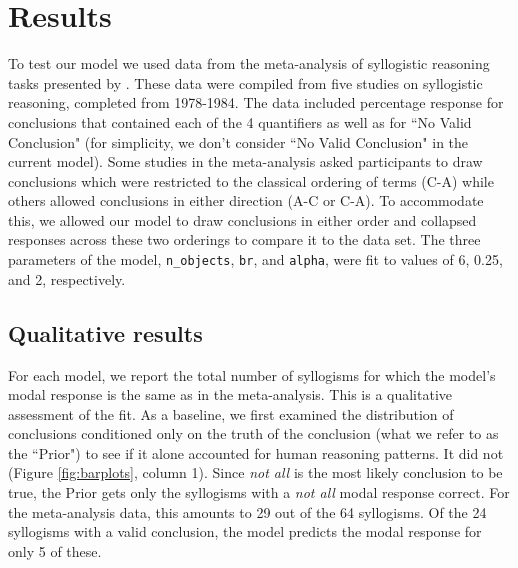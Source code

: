 \documentclass[10pt,letterpaper]{article}
\begin{document}
\section{Results}

To test our model we used data from the meta-analysis of syllogistic reasoning tasks presented by . These data were compiled from five studies on syllogistic reasoning, completed from 1978-1984. The data included percentage response for conclusions that contained each of the 4 quantifiers as well as for ``No Valid Conclusion" (for simplicity, we don't consider ``No Valid Conclusion" in the current model). Some studies in the meta-analysis asked participants to draw conclusions which were restricted to the classical ordering of terms (C-A) while others allowed conclusions in either direction (A-C or C-A). To accommodate this, we allowed our model to draw conclusions in either order and collapsed responses across these two orderings to compare it to the data set.
%
The three parameters of the model, \lstinline{n_objects}, \lstinline{br}, and \lstinline{alpha}, were fit to values of 6, 0.25, and 2, respectively.

\subsection{Qualitative results}
For each model, we report the total number of syllogisms for which the model's modal response is the same as in the meta-analysis. This is a qualitative assessment of the fit. 
As a baseline, we first examined the distribution of conclusions conditioned only on the truth of the conclusion (what we refer to as the ``Prior") to see if it alone accounted for human reasoning patterns. It did not (Figure \ref{fig:barplots}, column 1). Since \emph{not all} is the most likely conclusion to be true, the Prior gets only the syllogisms with a \emph{not all} modal response correct. For the meta-analysis data, this amounts to 29 out of the 64 syllogisms. Of the 24 syllogisms with a valid conclusion, the model predicts the modal response for only 5 of these.
\end{document}
